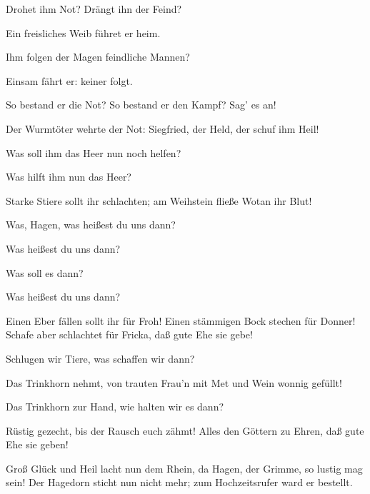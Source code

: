 \begin{drama}
Drohet ihm Not?
Drängt ihn der Feind?
 

\Hagenspeaks

Ein freisliches Weib führet er heim.
 

Ihm folgen der Magen feindliche Mannen?
 

\Hagenspeaks

Einsam fährt er: keiner folgt.
 

So bestand er die Not?
So bestand er den Kampf?
Sag' es an!
 

\Hagenspeaks

Der Wurmtöter wehrte der Not:
Siegfried, der Held, der schuf ihm Heil!
 

Was soll ihm das Heer nun noch helfen?
 

Was hilft ihm nun das Heer?
 

\Hagenspeaks

Starke Stiere sollt ihr schlachten;
am Weihstein fließe Wotan ihr Blut!
 

Was, Hagen, was heißest du uns dann?
 

Was heißest du uns dann?
 

Was soll es dann?
 

Was heißest du uns dann?
 

\Hagenspeaks

Einen Eber fällen sollt ihr für Froh!
Einen stämmigen Bock stechen für Donner!
Schafe aber schlachtet für Fricka,
daß gute Ehe sie gebe!
 



Schlugen wir Tiere,
was schaffen wir dann?
 

\Hagenspeaks

Das Trinkhorn nehmt,
von trauten Frau'n
mit Met und Wein wonnig gefüllt!
 

Das Trinkhorn zur Hand,
wie halten wir es dann?
 

\Hagenspeaks

Rüstig gezecht, bis der Rausch euch zähmt!
Alles den Göttern zu Ehren,
daß gute Ehe sie geben!
 



Groß Glück und Heil lacht nun dem Rhein,
da Hagen, der Grimme, so lustig mag sein!
Der Hagedorn sticht nun nicht mehr;
zum Hochzeitsrufer ward er bestellt.
 


\end{drama}
